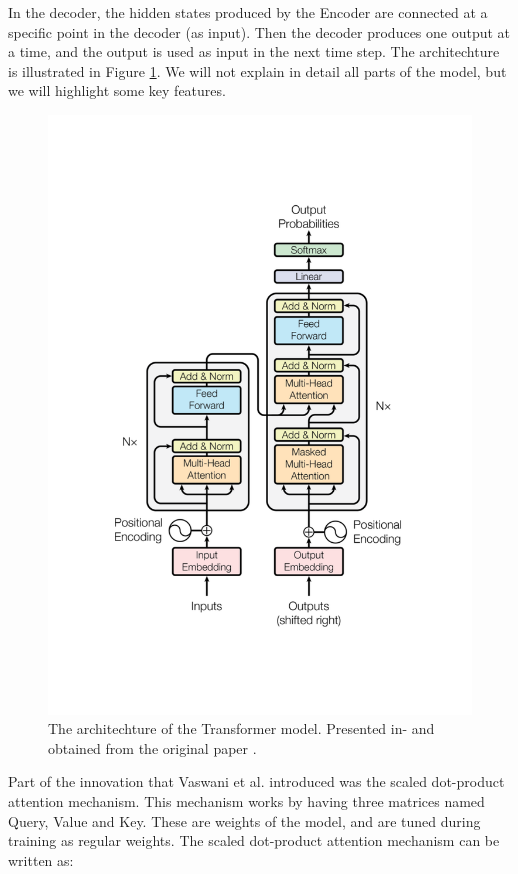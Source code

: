 In the decoder, the hidden states produced by the Encoder
are connected at a specific point in the decoder (as input).
Then the decoder produces one output at a time, and the output is used as input in the next time step.
The architechture is illustrated in Figure \ref{fig:attention}. We will not explain in detail 
all parts of the model, but we will highlight some key features.

\begin{figure}[h!]
    \centering %
    \includegraphics[scale=0.4]{../figs/attention.pdf} %
    \caption{The architechture of the Transformer model. Presented in- and obtained from the original paper \cite{vaswani2023attention}.} %
    \label{fig:attention}
\end{figure}

Part of the innovation that Vaswani et al. introduced was the scaled dot-product attention mechanism.
This mechanism works by having three matrices named 
Query, Value and Key. These are weights of the model,
and are tuned during training as regular weights.
The scaled dot-product attention mechanism can be written as:


